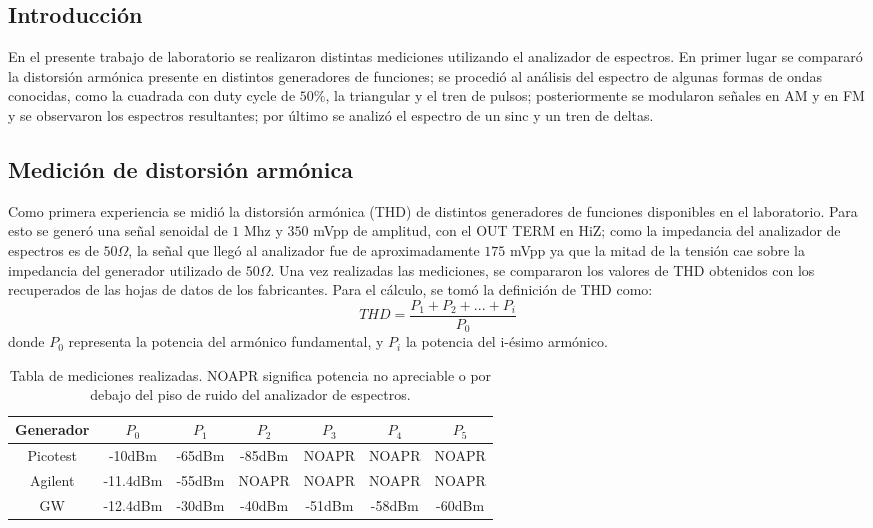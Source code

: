 \subsection{Introducción}

En el presente trabajo de laboratorio se realizaron distintas mediciones utilizando el analizador de espectros. En primer lugar se compararó la distorsión armónica presente en distintos generadores de funciones; se procedió al análisis del espectro de algunas formas de ondas conocidas, como la cuadrada con duty cycle de $50\%$, la triangular y el tren de pulsos; posteriormente se modularon señales en AM y en FM y se observaron los espectros resultantes; por último se analizó el espectro de un sinc y un tren de deltas.

\subsection{Medición de distorsión armónica}
Como primera experiencia se midió la distorsión armónica (THD) de distintos generadores de funciones disponibles en el laboratorio. Para esto se generó una señal senoidal de $1$ Mhz y $350$ mVpp de amplitud, con el OUT TERM en HiZ; como la impedancia del analizador de espectros es de $50 \Omega$, la señal que llegó al analizador fue de aproximadamente $175$ mVpp ya que la mitad de la tensión cae sobre la impedancia del generador utilizado de $50 \Omega$. Una vez realizadas las mediciones, se compararon los valores de THD obtenidos con los recuperados de las hojas de datos de los fabricantes. Para el cálculo, se tomó la definición de THD como:
\begin{equation}
    THD=\frac{P_1+P_2+...+P_i}{P_0}
    \label{eq:THD}
\end{equation}
donde $P_0$ representa la potencia del armónico fundamental, y $P_i$ la potencia del i-ésimo armónico.

\begin{table}[H]
\centering
\begin{tabular}{@{}ccccccc@{}}
\toprule
\textbf{Generador} & $P_0$ & $P_1$ & $P_2$ & $P_3$ & $P_4$ & $P_5$ \\ \midrule
Picotest & -10dBm & -65dBm & -85dBm & NOAPR & NOAPR & NOAPR \\
Agilent & -11.4dBm & -55dBm & NOAPR & NOAPR & NOAPR & NOAPR \\
GW & -12.4dBm & -30dBm & -40dBm & -51dBm & -58dBm & -60dBm \\ \bottomrule
\end{tabular}
\caption{Tabla de mediciones realizadas. NOAPR significa potencia no apreciable o por debajo del piso de ruido del analizador de espectros.}
\end{table}

